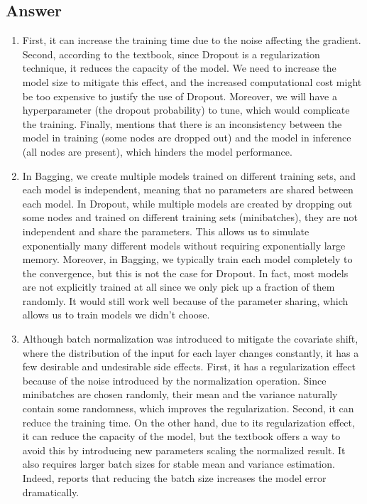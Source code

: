 \documentclass[
	12pt, %
]{../Template/fphw}
\begin{document}

\subsection*{Answer}
\begin{enumerate}[label = (\arabic*)]
    \item First, it can increase the training time due to the noise affecting the gradient. Second, according to the textbook, since Dropout is a regularization technique, it reduces the capacity of the model. We need to increase the model size to mitigate this effect, and the increased computational cost might be too expensive to justify the use of Dropout. Moreover, we will have a hyperparameter (the dropout probability) to tune, which would complicate the training. Finally, \cite{liang2021rdrop} mentions that there is an inconsistency between the model in training (some nodes are dropped out) and the model in inference (all nodes are present), which hinders the model performance.

    \item In Bagging, we create multiple models trained on different training sets, and each model is independent, meaning that no parameters are shared between each model. In Dropout, while multiple models are created by dropping out some nodes and trained on different training sets (minibatches), they are not independent and share the parameters. This allows us to simulate exponentially many different models without requiring exponentially large memory. Moreover, in Bagging, we typically train each model completely to the convergence, but this is not the case for Dropout. In fact, most models are not explicitly trained at all since we only pick up a fraction of them randomly. It would still work well because of the parameter sharing, which allows us to train models we didn't choose.

    \item Although batch normalization was introduced to mitigate the covariate shift, where the distribution of the input for each layer changes constantly, it has a few desirable and undesirable side effects. First, it has a regularization effect because of the noise introduced by the normalization operation. Since minibatches are chosen randomly, their mean and the variance naturally contain some randomness, which improves the regularization. Second, it can reduce the training time. On the other hand, due to its regularization effect, it can reduce the capacity of the model, but the textbook offers a way to avoid this by introducing new parameters scaling the normalized result. It also requires larger batch sizes for stable mean and variance estimation. Indeed, \cite{groupnorm} reports that reducing the batch size increases the model error dramatically.


\end{enumerate}
\end{document}
